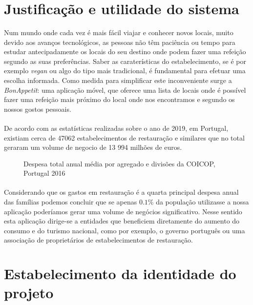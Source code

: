 \documentclass[a4paper,12pt]{scrreprt}
\begin{document}
\section{Justificação e utilidade do sistema}
    \paragraph{}
   Num mundo onde cada vez é mais fácil viajar e conhecer novos locais, muito devido aos avanços tecnológicos, as pessoas não têm paciência ou tempo para estudar antecipadamente os locais do seu destino onde podem fazer uma refeição segundo as suas preferências. Saber as caraterísticas do estabelecimento, se é por exemplo \textit{vegan} ou algo do tipo mais tradicional, é fundamental para efetuar uma escolha informada. Como medida para simplificar este inconveniente surge a \textit{BonAppetit}: uma aplicação móvel, que oferece uma lista de locais onde é possível fazer uma refeição mais próximo do local onde nos encontramos e segundo os nossos gostos pessoais.
   \paragraph{}
    De acordo com as estatísticas realizadas sobre o ano de 2019, em Portugal, existiam cerca de 47062 estabelecimentos de restauração e similares que no total geraram um volume de negocio de 13 994 milhões de euros\cite{ir}.
    
\begin{figure}[htp]
    \centering
    \caption{Despesa total anual média por agregado e divisões da COICOP, Portugal 2016}
    \label{fig:despesasrestaurantes}
\end{figure}

\paragraph{}
Considerando que os gastos em restauração é a quarta principal despesa anual das famílias podemos concluir que se apenas $0.1\%$ da população utilizasse a nossa aplicação poderíamos gerar uma volume de negócios significativo. Nesse sentido esta aplicação dirige-se a entidades que beneficiem diretamente do aumento do consumo e do turismo nacional, como por exemplo, o governo português ou uma associação de proprietários de estabelecimentos de restauração.
\section{Estabelecimento da identidade do projeto}
\end{document}
